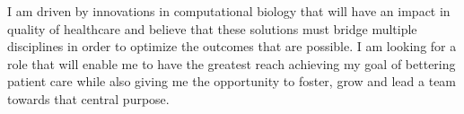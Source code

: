 \break
\begin{cvparagraph}
\par
{I am driven by innovations in computational biology that will have an impact in quality of healthcare and believe that these solutions must bridge multiple disciplines in order to optimize the outcomes that are possible. I am looking for a role that will enable me to have the greatest reach achieving my goal of bettering patient care while also giving me the opportunity to foster, grow and lead a team towards that central purpose. }
\end{cvparagraph}